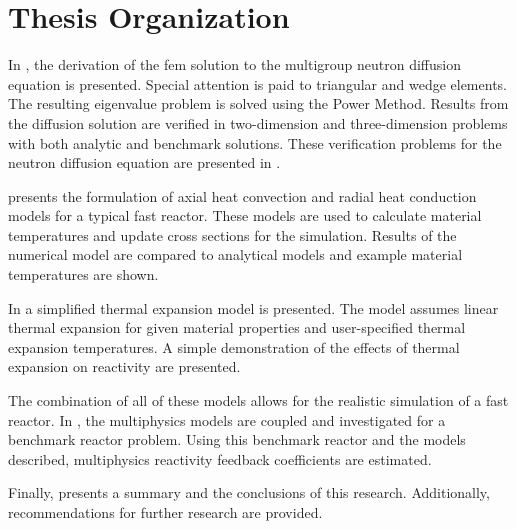 \section{Thesis Organization}
  In , the derivation of the \gls{fem} solution to
  the multigroup neutron diffusion equation is presented. Special attention is
  paid to triangular and wedge elements. The resulting eigenvalue problem is
  solved using the Power Method. Results from the diffusion solution are
  verified in two-dimension and three-dimension problems with both analytic and
  benchmark solutions. These verification problems for the neutron diffusion
  equation are presented in .

   presents the formulation of axial heat convection
  and radial heat conduction models for a typical fast reactor. These models are 
  used to calculate material temperatures and update cross sections for the 
  simulation. Results of the numerical model are compared to analytical models 
  and example material temperatures are shown.

  In  a simplified thermal expansion model is
  presented. The model assumes linear thermal expansion for given material
  properties and user-specified thermal expansion temperatures. A simple
  demonstration of the effects of thermal expansion on reactivity are presented.

  The combination of all of these models allows for the realistic simulation of
  a fast reactor. In , the multiphysics models are
  coupled and investigated for a benchmark reactor problem. Using this benchmark
  reactor and the models described, multiphysics reactivity feedback
  coefficients are estimated.
 
  Finally,  presents a summary and the conclusions of this
  research. Additionally, recommendations for further research are provided.
